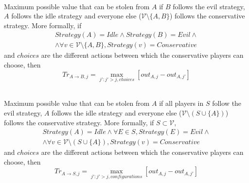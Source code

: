 \documentclass[11pt]{llncs}
\begin{document}
     \begin{definition} \ \\
        Maximum possible value that can be stolen from $A$ if $B$ follows the evil strategy, $A$ follows the idle strategy
        and everyone else ($\mathcal{V} \setminus \{A,B\}$) follows the conservative strategy. More formally, if
        \begin{equation}
        \begin{gathered}
           Strategy\left(A\right) = Idle \wedge Strategy\left(B\right) = Evil \wedge \\
           \wedge \forall v \in \mathcal{V} \setminus \{A,B\}, Strategy\left(v\right) = Conservative
        \end{gathered}
        \end{equation}
        and $choices$ are the different actions between which the conservative players can choose, then
        \begin{equation}
           Tr_{A \rightarrow B, j} = \max\limits_{j' : j' > j, choices}{\left[out_{A,j} - out_{A,j'}\right]}
        \end{equation}
     \end{definition}
     \begin{definition}
        \ \\Maximum possible value that can be stolen from $A$ if all players in $S$ follow the evil strategy, $A$ follows
        the idle strategy and everyone else ($\mathcal{V} \setminus \left(S \cup \{A\}\right)$) follows the conservative
        strategy. More formally, if $S \subset \mathcal{V}$,
        \begin{equation}
        \begin{gathered}
           Strategy\left(A\right) = Idle \wedge \forall E \in S, Strategy\left(E\right) = Evil \wedge \\
           \wedge \forall v \in \mathcal{V} \setminus \left(S \cup \{A\}\right), Strategy\left(v\right) = Conservative
        \end{gathered}
        \end{equation}
        and $choices$ are the different actions between which the conservative players can choose, then
        \begin{equation}
           Tr_{A \rightarrow S, j} = \max\limits_{j' : j' > j, configurations}{\left[out_{A,j} - out_{A,j'}\right]}
        \end{equation}
     \end{definition}
\end{document}

